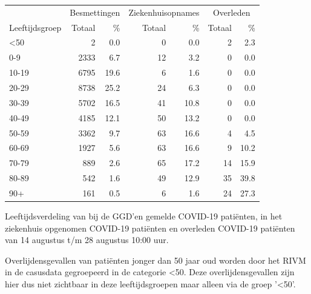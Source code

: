 \documentclass[
  english,
  man,floatsintext]{apa6}
\begin{document}
\begin{table}
\centering\begingroup\fontsize{11}{13}\selectfont

\begin{threeparttable}
\begin{tabular}{lrrrrrr}
\toprule
\multicolumn{1}{c}{ } & \multicolumn{2}{c}{Besmettingen} & \multicolumn{2}{c}{Ziekenhuisopnames} & \multicolumn{2}{c}{Overleden} \\
\cmidrule(l{3pt}r{3pt}){2-3} \cmidrule(l{3pt}r{3pt}){4-5} \cmidrule(l{3pt}r{3pt}){6-7}
Leeftijdsgroep & Totaal & \% & Totaal & \% & Totaal & \%\\
\midrule
<50 & 2 & 0.0 & 0 & 0.0 & 2 & 2.3\\
0-9 & 2333 & 6.7 & 12 & 3.2 & 0 & 0.0\\
10-19 & 6795 & 19.6 & 6 & 1.6 & 0 & 0.0\\
20-29 & 8738 & 25.2 & 24 & 6.3 & 0 & 0.0\\
30-39 & 5702 & 16.5 & 41 & 10.8 & 0 & 0.0\\
40-49 & 4185 & 12.1 & 50 & 13.2 & 0 & 0.0\\
50-59 & 3362 & 9.7 & 63 & 16.6 & 4 & 4.5\\
60-69 & 1927 & 5.6 & 63 & 16.6 & 9 & 10.2\\
70-79 & 889 & 2.6 & 65 & 17.2 & 14 & 15.9\\
80-89 & 542 & 1.6 & 49 & 12.9 & 35 & 39.8\\
90+ & 161 & 0.5 & 6 & 1.6 & 24 & 27.3\\
\bottomrule
\end{tabular}
\begin{tablenotes}
\item[1] Leeftijdsverdeling van bij de GGD’en gemelde COVID-19 patiënten, in het ziekenhuis opgenomen COVID-19 patiënten en overleden COVID-19 patiënten van 14 augustus t/m 28 augustus 10:00 uur.
\item[2] Overlijdensgevallen van patiënten jonger dan 50 jaar oud worden door het RIVM in de casusdata gegroepeerd in de categorie <50. Deze overlijdensgevallen zijn hier dus niet zichtbaar in deze leeftijdsgroepen maar alleen via de groep '<50'.
\end{tablenotes}
\end{threeparttable}
\endgroup{}
\end{table}

\newpage
\end{document}
